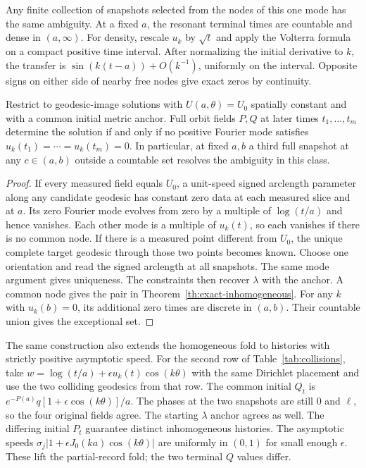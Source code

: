 Any finite collection of snapshots selected from the nodes
of this one mode has the same ambiguity. At a fixed $a$,
the resonant terminal times are countable and dense in $(a,\infty)$.
For density, rescale $u_k$ by $\sqrt t$ and apply the
Volterra formula on a compact positive time interval.
After normalizing the initial derivative to $k$, the
transfer is $\sin(k(t-a))+O(k^{-1})$, uniformly on the
interval. Opposite signs on either side of nearby free nodes
give exact zeros by continuity.

\begin{proposition}
\label{prop:third}
Restrict to geodesic-image solutions with $U(a,\theta)=U_0$
spatially constant and with a common initial metric anchor.
Full orbit fields $P,Q$ at later times $t_1,\dots,t_m$
determine the solution if and only if no positive Fourier
mode satisfies $u_k(t_1)=\cdots=u_k(t_m)=0$.
In particular, at fixed $a,b$ a third full snapshot at any
$c\in(a,b)$ outside a countable set resolves the ambiguity
in this class.
\end{proposition}

\begin{proof}
If every measured field equals $U_0$, a unit-speed signed
arclength parameter along any candidate geodesic has
constant zero data at each measured slice and at $a$.
Its zero Fourier mode evolves from zero by a multiple of
$\log(t/a)$ and hence vanishes. Each other mode is a multiple
of $u_k(t)$, so each vanishes if there is no common node.
If there is a measured point different from $U_0$, the unique
complete target geodesic through those two points becomes
known. Choose one orientation and read the signed arclength
at all snapshots. The same mode argument gives uniqueness.
The constraints then recover $\lambda$ with the anchor.
A common node gives the pair in Theorem~\ref{th:exact-inhomogeneous}.
For any $k$ with $u_k(b)=0$, its additional zero times
are discrete in $(a,b)$. Their countable union gives the
exceptional set.
\end{proof}



The same construction also extends the homogeneous fold
to histories with strictly positive asymptotic speed.
For the second row of Table~\ref{tab:collisions}, take
$w=\log(t/a)+\epsilon u_k(t)\cos(k\theta)$
with the same Dirichlet placement and use the two colliding
geodesics from that row. The common initial $Q_t$ is
$e^{-P(a)}q[1+\epsilon\cos(k\theta)]/a$.
The phases at the two snapshots are still $0$ and $\ell$,
so the four original fields agree. The starting $\lambda$
anchor agrees as well. The differing initial $P_t$ guarantee
distinct inhomogeneous histories. The asymptotic speeds
$\sigma_j|1+\epsilon J_0(ka)\cos(k\theta)|$ are uniformly
in $(0,1)$ for small enough $\epsilon$. These lift the
partial-record fold; the two terminal $Q$ values differ.

